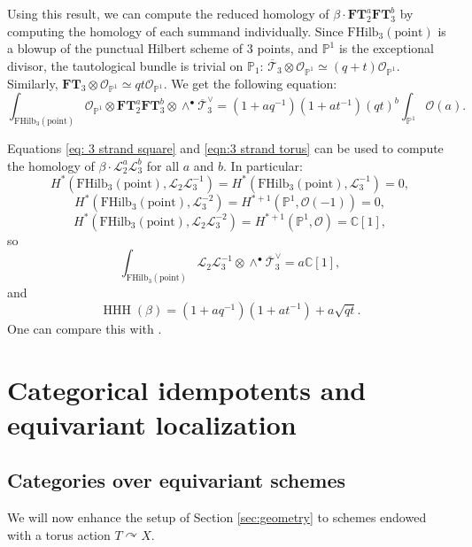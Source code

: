 \documentclass[12pt]{amsart}
\numberwithin{equation}{section}
\theoremstyle{definition}
\theoremstyle{remark}
\DeclareMathOperator{\HHH}{HHH}
\newcommand{\CC}{\mathbb{C}}
\newcommand{\PP}{\mathbb{P}}
\newcommand{\cat}{\mathcal{C}}
\newcommand{\CL}{\mathcal{L}}
\newcommand{\CO}{\mathcal{O}}
\newcommand{\CT}{\mathcal{T}}
\newcommand{\FT}{\mathbf{FT}}
\renewcommand{\1}{\mathbf{1}}
\newcommand{\coh}{\mathrm{Coh}}
\newcommand{\FH}{\mathrm{FHilb}}
\newcommand{\point}{\mathrm{point}}
\begin{document}
Using this result, we can compute the reduced homology of $\beta\cdot \FT_2^{a}\FT_3^{b}$ by computing the homology of each summand individually. Since $\FH_3(\point)$ is a blowup of the punctual Hilbert scheme of 3 points, and $\PP^1$ is the exceptional divisor, the tautological bundle is trivial on $\PP_1$: $\overline{\CT}_3\otimes \CO_{\PP^1}\simeq (q+t)\CO_{\PP^1}$. Similarly, $\FT_3\otimes \CO_{\PP^1}\simeq qt\CO_{\PP^1}$.  We get the following equation:
\begin{equation}
\label{eq: 3 strand square}
\int_{\FH_3(\point)}\CO_{\PP^1}\otimes \FT_2^{a}\FT_3^{b}\otimes \wedge^{\bullet}\overline{\CT}_3^{\vee}=
(1+aq^{-1})(1+at^{-1})(qt)^{b}\int_{\PP^1}\CO(a).
\end{equation}

Equations \eqref{eq: 3 strand square} and \eqref{eqn:3 strand torus} can be used to compute the homology of $\beta\cdot \CL_2^{a}\CL_3^{b}$ for all $a$ and $b$. In particular:
$$
H^*(\FH_3(\point),\CL_2\CL_3^{-1})=H^*(\FH_3(\point),\CL_3^{-1})=0,
$$
$$
H^*(\FH_3(\point),\CL_3^{-2})=H^{*+1}(\PP^1,\CO(-1))=0,
$$
$$
H^*(\FH_3(\point),\CL_2\CL_3^{-2})=H^{*+1}(\PP^1,\CO)=\CC[1],
$$
so 
$$
\int_{\FH_3(\point)}\CL_2\CL_3^{-1}\otimes \wedge^{\bullet}\overline{\CT}_3^{\vee}=a\CC[1],
$$
and
$$
\HHH(\beta)=(1+aq^{-1})(1+at^{-1})+a\sqrt{qt}.
$$
One can compare this with \cite[Table 5.7]{DGR}.

\section{Categorical idempotents and equivariant localization}
\label{sec:equiv}

\subsection{Categories over equivariant schemes}
\label{sub:equivcategories}

We will now enhance the setup of Section \ref{sec:geometry} to schemes endowed with a torus action $T \curvearrowright X$. %
\end{document}
